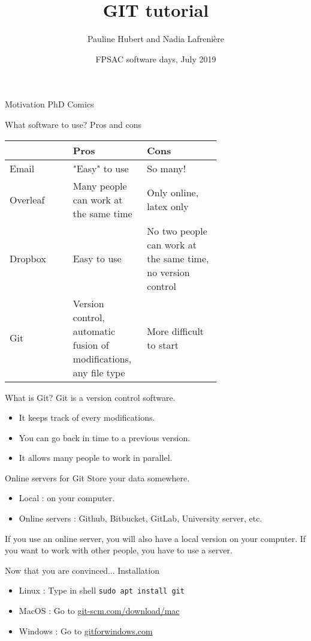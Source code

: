 \documentclass{beamer}
\title{GIT tutorial}
\author{Pauline Hubert and Nadia Lafrenière}
\date{FPSAC software days, July 2019}
\begin{document}
	\maketitle
	\begin{frame}{Motivation}
		PhD Comics
	\end{frame}
	\begin{frame}{What software to use? Pros and cons}
		\begin{tabular}{lp{0.35\linewidth}p{0.35\linewidth}}
			& Pros & Cons\\
			\hline
			Email & "Easy" to use & So many!\\
			\hline
			Overleaf & Many people can work at the same time & Only online, latex only\\
			\hline
			Dropbox & Easy to use & No two people can work at the same time, no version control\\
			\hline
			Git & Version control, automatic fusion of modifications, any file type & More difficult to start\\
		\end{tabular}
	\end{frame}
	\begin{frame}{What is Git?}
		Git is a version control software. \newline
		
		\begin{itemize}
			\item It keeps track of every modifications.
			\item You can go back in time to a previous version.
			\item It allows many people to work in parallel.
		\end{itemize}	
	\end{frame}
	\begin{frame}{Online servers for Git}
		Store your data somewhere. \newline 
			\begin{itemize}
				\item Local : on your computer.
				\item Online servers : Github, Bitbucket, GitLab, University server, etc. \newline
			\end{itemize}
		If you use an online server, you will also have a local version on your computer. If you want to work with other people, you have to use a server. 
	\end{frame}
	\begin{frame}{Now that you are convinced... Installation}
		\begin{itemize}
			\item Linux : Type in shell \texttt{sudo apt install git}
			\item MacOS : Go to \url{git-scm.com/download/mac}
			\item Windows : Go to \url{gitforwindows.com}
		\end{itemize}
	\end{frame}
\end{document}
